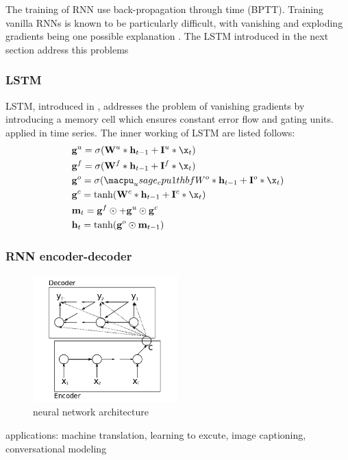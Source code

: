 \documentclass[5p]{elsarticle}
\begin{document}
The training of RNN use back-propagation through time (BPTT). Training vanilla RNNs is known to be particularly difficult, with vanishing and exploding gradients being one possible explanation \cite{pascanu2012difficulty}. The LSTM introduced in the next section address this problems

\subsubsection{LSTM}
LSTM, introduced in \cite{Hochreiter1997LongMemory}, addresses the problem of vanishing gradients by introducing a memory cell which ensures constant error flow and gating units. \cite{MalhotraLongSeries} applied in time series. The inner working of LSTM are listed follows:
\begin{equation}
	\begin{split}
		& \mathbf g^u = \sigma(\mathbf W^u * \mathbf h_{t-1} + \mathbf I^u * \x_t) \\
		& \mathbf g^f = \sigma(\mathbf W^f * \mathbf h_{t-1} + \mathbf I^f * \x_t) \\
		& \mathbf g^o = \sigma(\macpu_usage_cpu1thbf W^o * \mathbf h_{t-1} + \mathbf I^o * \x_t) \\
		& \mathbf g^c = \tanh(\mathbf W^c * \mathbf h_{t-1} + \mathbf I^c * \x_t) \\
		& \mathbf m_t = \mathbf g^f \odot \mathbf +  \mathbf g^u \odot \mathbf g^c \\
		& \mathbf h_t = \tanh(\mathbf g^o \odot \mathbf m_{t-1})
	\end{split}
\end{equation}

\subsubsection{RNN encoder-decoder}
\cite{ChoLearningTranslation}
\begin{figure}[h]
    \centering
    \includegraphics[width=0.5\textwidth]{RNN_encoder-decoder.png}
    \caption{neural network architecture}
    \label{fig:RNN_encoder-decoder}
\end{figure}
applications: machine translation, learning to excute, image captioning, conversational modeling
\end{document}
